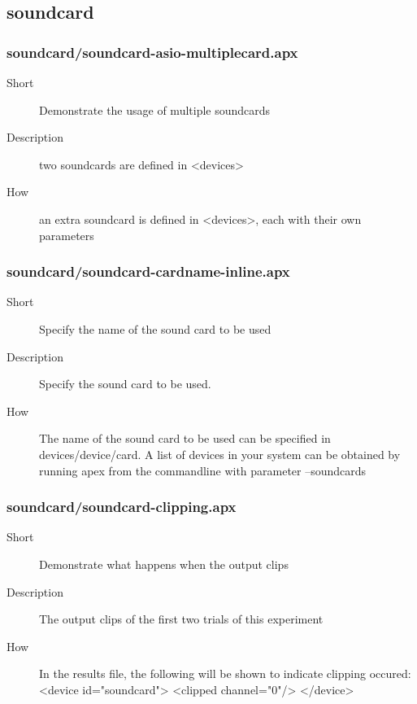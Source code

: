 \subsection{soundcard}
\subsubsection{soundcard/soundcard-asio-multiplecard.apx}
\begin{description}
\item[Short] 
 Demonstrate the usage of multiple soundcards
\item[Description] 
 two soundcards are defined in \textless{}devices\textgreater{}
\item[How] 
 an extra soundcard is defined in \textless{}devices\textgreater{}, each with their own parameters
\end{description}

\subsubsection{soundcard/soundcard-cardname-inline.apx}
\begin{description}
\item[Short] 
 Specify the name of the sound card to be used
\item[Description] 
 Specify the sound card to be used.
\item[How] 
 The name of the sound card to be used can be specified in devices/device/card.  A list of devices in your system can be obtained by running apex from the commandline with parameter --soundcards
\end{description}

\subsubsection{soundcard/soundcard-clipping.apx}
\begin{description}
\item[Short] 
 Demonstrate what happens when the output clips
\item[Description] 
 The output clips of the first two trials of this experiment
\item[How] 
 In the results file, the following will be shown to indicate clipping occured: \textless{}device id="soundcard"\textgreater{}  \textless{}clipped channel="0"/\textgreater{} \textless{}/device\textgreater{}
\end{description}


